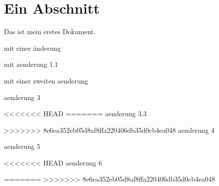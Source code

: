 \documentclass{scrartcl}
\begin{document}
\section{Ein Abschnitt}
Das ist mein erstes Dokument.

mit einer änderung

mit aenderung 1.1

mit einer zweiten aenderung

aenderung 3

<<<<<<< HEAD
=======
aenderung 3.3

>>>>>>> 8e6ea352eb05d8af8ffa220406db35d0cb4ea048
aenderung 4

aenderung 5

<<<<<<< HEAD
aenderung 6

=======
>>>>>>> 8e6ea352eb05d8af8ffa220406db35d0cb4ea048
\end{document}
